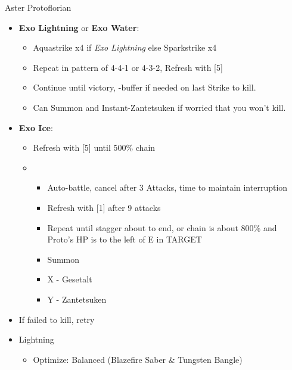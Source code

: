 \begin{battle}[1:45]{Aster Protoflorian}
\begin{itemize}
\begin{itemize}
				      \item \stagger
			      \end{itemize}
			\item \textbf{Exo Lightning} or \textbf{Exo Water}:
			      \begin{itemize}
				      \item Aquastrike x4 if \textit{Exo Lightning} else Sparkstrike x4
				      \item Repeat in pattern of 4-4-1 or 4-3-2, Refresh with [5]
				      \item Continue until victory, \com-buffer if needed on last Strike to kill.
				      \item Can Summon and Instant-Zantetsuken if worried that you won't kill.
			      \end{itemize}
			\item \textbf{Exo Ice}:
			      \begin{itemize}
				      \item Refresh with [5] until 500\% chain
				      \item \sixth
				            \begin{itemize}
					            \item Auto-battle, cancel after 3 Attacks, time to maintain interruption
					            \item Refresh with [1] after 9 attacks
					            \item Repeat until stagger about to end, or chain is about 800\% and Proto's HP is to the left of E in TARGET
					            \item Summon
					            \item X - Gesetalt
					            \item Y - Zantetsuken
				            \end{itemize}
			      \end{itemize}
			\item If failed to kill, retry
		\end{itemize}
\end{battle}
	\begin{menu}
		\begin{itemize}
			\equip
			\begin{itemize}
				\item Lightning
				      \begin{itemize}
					      \item Optimize: Balanced (Blazefire Saber \& Tungsten Bangle)
				      \end{itemize}
			\end{itemize}
		\end{itemize}
	\end{menu}

	\vfill
\ 
\columnbreak